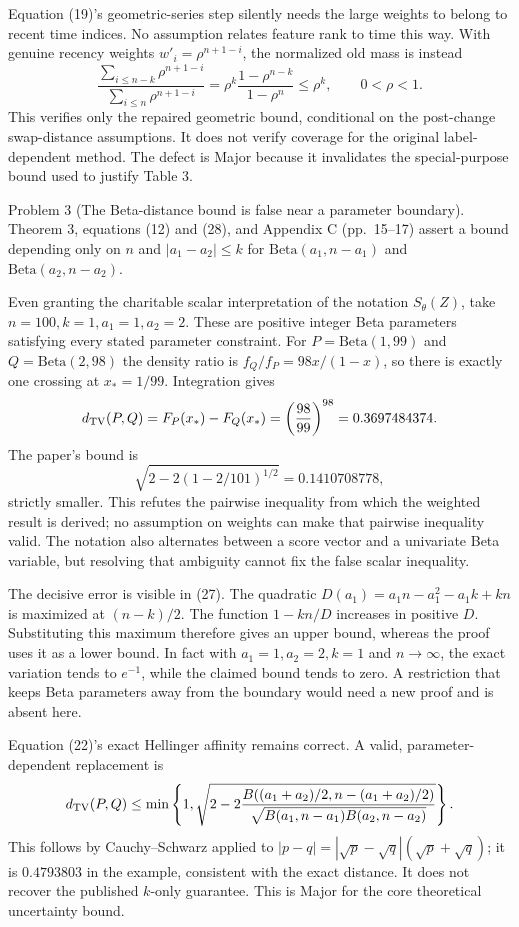 \documentclass[10pt]{article}
\begin{document}
Equation (19)’s geometric-series step silently needs the large weights to belong to recent time indices. No assumption relates feature rank to time this way. With genuine recency weights \(w'_i=\rho^{n+1-i}\), the normalized old mass is instead \[\frac{\sum_{i\le n-k}\rho^{n+1-i}}
 {\sum_{i\le n}\rho^{n+1-i}}
 =\rho^k\frac{1-\rho^{n-k}}{1-\rho^n}\le\rho^k,
 \qquad 0<\rho<1.\] This verifies only the repaired geometric bound, conditional on the post-change swap-distance assumptions. It does not verify coverage for the original label-dependent method. The defect is Major because it invalidates the special-purpose bound used to justify Table 3.\par
Problem 3 (The Beta-distance bound is false near a parameter boundary).  Theorem 3, equations (12) and (28), and Appendix C (pp. 15–17) assert a bound depending only on \(n\) and \(|a_1-a_2|\le k\) for \(\mathrm{Beta}(a_1,n-a_1)\) and \(\mathrm{Beta}(a_2,n-a_2)\).\par
Even granting the charitable scalar interpretation of the notation \(S_\theta(Z)\), take \(n=100,k=1,a_1=1,a_2=2\). These are positive integer Beta parameters satisfying every stated parameter constraint. For \(P=\mathrm{Beta}(1,99)\) and \(Q=\mathrm{Beta}(2,98)\) the density ratio is \(f_Q/f_P=98x/(1-x)\), so there is exactly one crossing at \(x_*=1/99\). Integration gives \[d_{\rm TV}(P,Q)=F_P(x_*)-F_Q(x_*)
 =\left(\frac{98}{99}\right)^{98}=0.3697484374.\] The paper’s bound is \[\sqrt{2-2(1-2/101)^{1/2}}=0.1410708778,\] strictly smaller. This refutes the pairwise inequality from which the weighted result is derived; no assumption on weights can make that pairwise inequality valid. The notation also alternates between a score vector and a univariate Beta variable, but resolving that ambiguity cannot fix the false scalar inequality.\par
The decisive error is visible in (27). The quadratic \(D(a_1)=a_1n-a_1^2-a_1k+kn\) is maximized at \((n-k)/2\). The function \(1-kn/D\) increases in positive \(D\). Substituting this maximum therefore gives an upper bound, whereas the proof uses it as a lower bound. In fact with \(a_1=1,a_2=2,k=1\) and \(n\to\infty\), the exact variation tends to \(e^{-1}\), while the claimed bound tends to zero. A restriction that keeps Beta parameters away from the boundary would need a new proof and is absent here.\par
Equation (22)’s exact Hellinger affinity remains correct. A valid, parameter-dependent replacement is \[d_{\rm TV}(P,Q)\le\min\left\{1,
 \sqrt{2-2\frac{B((a_1+a_2)/2,n-(a_1+a_2)/2)}
 {\sqrt{B(a_1,n-a_1)B(a_2,n-a_2)}}}\right\}.\] This follows by Cauchy–Schwarz applied to \(|p-q|=|\sqrt p-\sqrt q|(\sqrt p+\sqrt q)\); it is \(0.4793803\) in the example, consistent with the exact distance. It does not recover the published \(k\)-only guarantee. This is Major for the core theoretical uncertainty bound.\par
\end{document}
